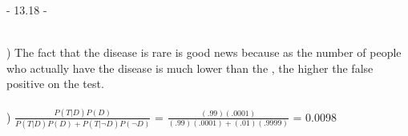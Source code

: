 \documentclass[12pt]{article}
\begin{document}
\noindent \hrulefill



\centerline{- 13.18 - }
\ \\
) The fact that the disease is rare is good news because as the number of people who actually have the disease is much lower than the , the higher the false positive on the test.\\\\
) {\Large $\frac{P(T|D)P(D)}{P(T|D)P(D)+P(T|\neg D)P(\neg D)}$} = {\Large $\frac{(.99)(.0001)}{(.99)(.0001) + (.01)(.9999)}$} = 0.0098\\
\end{document}
